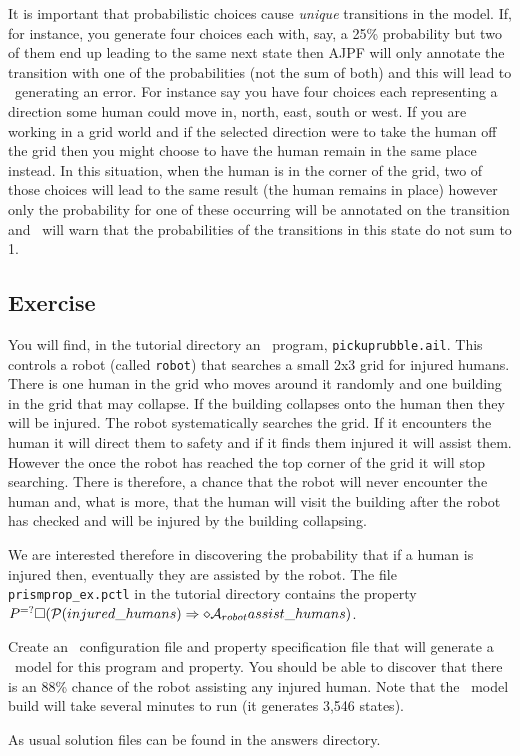 It is important that probabilistic choices cause \emph{unique} transitions in the model.  If, for instance, you generate four choices each with, say, a 25\% probability but two of them end up leading to the same next state then AJPF will only annotate the transition with one of the probabilities (not the sum of both) and this will lead to \prism\ generating an error.  For instance say you have four choices each representing a direction some human could move in, north, east, south or west.  If you are working in a grid world and if the selected direction were to take the human off the grid then you might choose to have the human remain in the same place instead.  In this situation, when the human is in the corner of the grid, two of those choices will lead to the same result (the human remains in place) however only the probability for one of these occurring will be annotated on the transition and \prism\ will warn that the probabilities of the transitions in this state do not sum to 1.

\subsection{Exercise}

You will find, in the tutorial directory an \ail\ program, \texttt{pickuprubble.ail}.  This controls a robot (called \texttt{robot}) that searches a small 2x3 grid for injured humans.  There is one human in the grid who moves around it randomly and one building in the grid that may collapse.  If the building collapses onto the human then they will be injured.  The robot systematically searches the grid.  If it encounters the human it will direct them to safety and if it finds them injured it will assist them.  However the once the robot has reached the top corner of the grid it will stop searching.  There is therefore, a chance that the robot will never encounter the human and, what is more, that the human will visit the building after the robot has checked and will be injured by the building collapsing.

\begin{sloppypar}
We are interested therefore in discovering the probability that if a human is injured then, eventually they are assisted by the robot.  The file \texttt{prismprop\_ex.pctl} in the tutorial directory contains the property $P^{=?}\Box (\mathrm{{\cal P}}(injured\_humans) \Rightarrow  \diamond \mathrm{{\cal A}}_{robot} assist\_humans)$.  
\end{sloppypar}

Create an \ajpf\ configuration file and property specification file that will generate a \prism\ model for this program and property.  You should be able to discover that there is an 88\% chance of the robot assisting any injured human.  Note that the \ajpf\ model build will take several minutes to run (it generates 3,546 states).

As usual solution files can be found in the answers directory.

